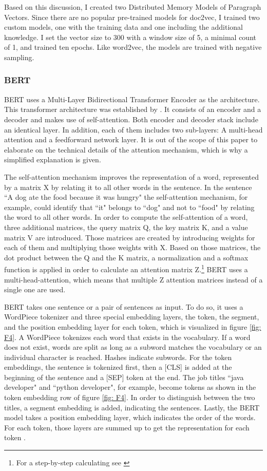 \documentclass[12pt, a4paper, titlepage]{article}
\begin{document}
Based on this discussion, I created two Distributed Memory Models of Paragraph Vectors. Since there are no popular pre-trained models for doc2vec, I trained two custom models, one with the training data and one including the additional knowledge. I set the vector size to 300 with a window size of 5, a minimal count of 1, and trained ten epochs. Like word2vec, the models are trained with negative sampling. 

\subsubsection*{BERT}
\ac{BERT} uses a Multi-Layer Bidirectional Transformer Encoder as the architecture. This transformer architecture was established by \citet{vaswani2017}. It consists of an encoder and a decoder and makes use of self-attention. Both encoder and decoder stack include an identical layer. In addition, each of them includes two sub-layers: A multi-head attention and a feedforward network layer. It is out of the scope of this paper to elaborate on the technical details of the attention mechanism, which is why a simplified explanation is given. 

The self-attention mechanism improves the representation of a word, represented by a matrix X by relating it to all other words in the sentence. In the sentence ``A dog ate the food because it was hungry" \citep[10]{ravichandiran2021} the self-attention mechanism, for example, could identify that ``it" belongs to ``dog" and not to ``food" by relating the word to all other words. In order to compute the self-attention of a word, three additional matrices, the query matrix Q, the key matrix K, and a value matrix V are introduced. Those matrices are created by introducing weights for each of them and multiplying those weights with X. Based on those matrices, the dot product between the Q and the K matrix, a normalization and a softmax function is applied in order to calculate an attention matrix Z.\footnote{For a step-by-step calculating see \citep{ravichandiran2021}} \ac{BERT} uses a multi-head-attention, which means that multiple Z attention matrices instead of a single one are used.

\ac{BERT} takes one sentence or a pair of sentences as input. To do so, it uses a WordPiece tokenizer and three special embedding layers, the token, the segment, and the position embedding layer for each token, which is visualized in figure \ref{fig: F4}. A WordPiece tokenizes each word that exists in the vocabulary. If a word does not exist, words are split as long as a subword matches the vocabulary or an individual character is reached. Hashes indicate subwords. For the token embeddings, the sentence is tokenized first, then a [CLS] is added at the beginning of the sentence and a [SEP] token at the end. The job titles ``java developer" and ``python developer", for example, become tokens as shown in the token embedding row of figure  \ref{fig: F4}. In order to distinguish between the two titles, a segment embedding is added, indicating the sentences. Lastly, the \ac{BERT} model takes a position embedding layer, which indicates the order of the words. For each token, those layers are summed up to get the representation for each token \citep{devlin2018,ravichandiran2021}.
\end{document}
